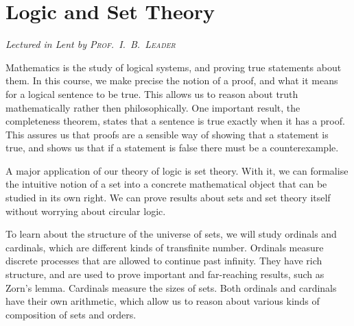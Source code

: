 \chapter[Logic and Set Theory \\ \textnormal{\emph{Lectured in Lent \oldstylenums{2023} by \textsc{Prof.\ I.\ B.\ Leader}}}]{Logic and Set Theory}
\emph{\Large Lectured in Lent  by \textsc{Prof.\ I.\ B.\ Leader}}

Mathematics is the study of logical systems, and proving true statements about them.
In this course, we make precise the notion of a proof, and what it means for a logical sentence to be true.
This allows us to reason about truth mathematically rather then philosophically.
One important result, the completeness theorem, states that a sentence is true exactly when it has a proof.
This assures us that proofs are a sensible way of showing that a statement is true, and shows us that if a statement is false there must be a counterexample.

A major application of our theory of logic is set theory.
With it, we can formalise the intuitive notion of a set into a concrete mathematical object that can be studied in its own right.
We can prove results about sets and set theory itself without worrying about circular logic.

To learn about the structure of the universe of sets, we will study ordinals and cardinals, which are different kinds of transfinite number.
Ordinals measure discrete processes that are allowed to continue past infinity.
They have rich structure, and are used to prove important and far-reaching results, such as Zorn's lemma.
Cardinals measure the sizes of sets.
Both ordinals and cardinals have their own arithmetic, which allow us to reason about various kinds of composition of sets and orders.


